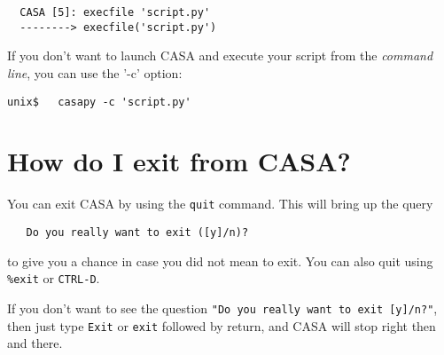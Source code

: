 \small
\begin{verbatim}
  CASA [5]: execfile 'script.py'
  --------> execfile('script.py')
\end{verbatim}
\normalsize

If you don't want to launch CASA and execute your script from the
{\it command line}, you can use the '-c' option:

\small
\begin{verbatim}
unix$   casapy -c 'script.py'
\end{verbatim}
\normalsize

\section{How do I exit from CASA?}
\label{section:python.exit}

You can exit CASA by using the {\tt quit} command.  This will bring up the
query
\small
\begin{verbatim}
   Do you really want to exit ([y]/n)?
\end{verbatim}
\normalsize
to give you a chance in case you did not mean to exit.  You can
also quit using {\tt \%exit} or {\tt CTRL-D}.

If you don't want to see the question {\tt "Do you really want to exit
[y]/n?"}, then just type {\tt Exit} or {\tt exit} followed by 
return, and CASA will stop right then and there.

